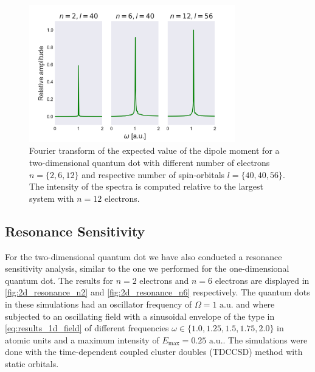 \begin{figure}
    \centering
    \includegraphics[width=0.8\textwidth]{results/figures/2D/2d_spectrum.png} 
    \caption{Fourier transform of the expected value of the dipole moment for a
        two-dimensional quantum dot with different number of electrons 
        $n=\{2,6,12\}$ and respective number of spin-orbitals 
        $l=\{40,40,56\}$. The intensity of the spectra is computed relative to the 
        largest system with $n=12$ electrons.
    }
    \label{fig:2d_dipole_spectra}
\end{figure}

\subsection{Resonance Sensitivity}

For the two-dimensional quantum dot we have also conducted a resonance sensitivity analysis,
similar to the one we performed for the one-dimensional quantum dot. The results for 
$n=2$ electrons and $n=6$ electrons are displayed in \autoref{fig:2d_resonance_n2}
and \autoref{fig:2d_resonance_n6} respectively. The quantum dots in these simulations 
had an oscillator frequency of $\Omega=1 \text{ a.u.}$ and where subjected to an oscillating 
field with a sinusoidal envelope of the type in \autoref{eq:results_1d_field} of 
different frequencies $\omega\in\{1.0,1.25,1.5,1.75,2.0\}$ in atomic units and a maximum intensity of 
$E_\text{max}=0.25 \text{ a.u.}$. The simulations were done with the time-dependent coupled 
cluster doubles (TDCCSD) method with static orbitals.

